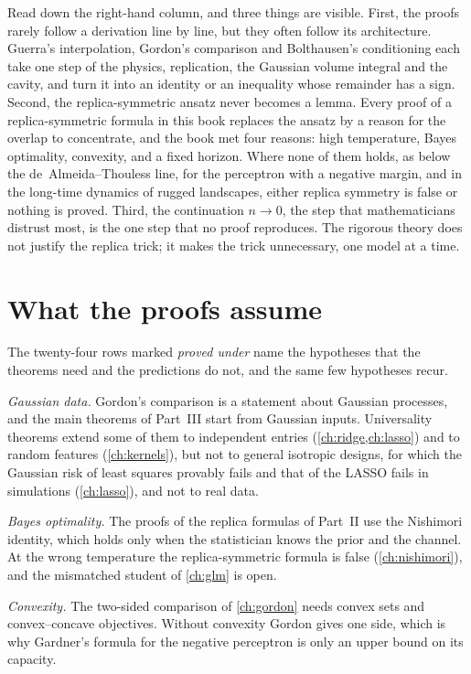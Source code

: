 \begin{refsection}
Read down the right-hand column, and three things are visible. First, the proofs rarely follow a derivation line by line, but they often follow its architecture. Guerra's interpolation, Gordon's comparison and Bolthausen's conditioning each take one step of the physics, replication, the Gaussian volume integral and the cavity, and turn it into an identity or an inequality whose remainder has a sign. Second, the replica-symmetric ansatz never becomes a lemma. Every proof of a replica-symmetric formula in this book replaces the ansatz by a reason for the overlap to concentrate, and the book met four reasons: high temperature, Bayes optimality, convexity, and a fixed horizon. Where none of them holds, as below the de~Almeida--Thouless line, for the perceptron with a negative margin, and in the long-time dynamics of rugged landscapes, either replica symmetry is false or nothing is proved. Third, the continuation $n\to0$, the step that mathematicians distrust most, is the one step that no proof reproduces. The rigorous theory does not justify the replica trick; it makes the trick unnecessary, one model at a time.

\section*{What the proofs assume}

The twenty-four rows marked \emph{proved under} name the hypotheses that the theorems need and the predictions do not, and the same few hypotheses recur.

\emph{Gaussian data.} Gordon's comparison is a statement about Gaussian processes, and the main theorems of Part~III start from Gaussian inputs. Universality theorems extend some of them to independent entries (\cref{ch:ridge,ch:lasso}) and to random features (\cref{ch:kernels}), but not to general isotropic designs, for which the Gaussian risk of least squares provably fails and that of the LASSO fails in simulations \parencite{HanShen2023} (\cref{ch:lasso}), and not to real data.

\emph{Bayes optimality.} The proofs of the replica formulas of Part~II use the Nishimori identity, which holds only when the statistician knows the prior and the channel. At the wrong temperature the replica-symmetric formula is false (\cref{ch:nishimori}), and the mismatched student of \cref{ch:glm} is open.

\emph{Convexity.} The two-sided comparison of \cref{ch:gordon} needs convex sets and convex--concave objectives. Without convexity Gordon gives one side, which is why Gardner's formula for the negative perceptron is only an upper bound on its capacity.


\end{refsection}
